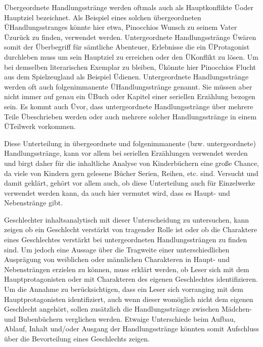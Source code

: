         Übergeordnete Handlungsstränge werden oftmals auch als Hauptkonflikte
        Üoder Hauptziel bezeichnet. Als Beispiel eines solchen übergeordneten
        ÜHandlungsstranges könnte hier etwa, Pinocchios Wunsch zu seinem Vater
        Üzurück zu finden, verwendet werden. Untergeordnete Handlungsstränge
        Üwären somit der Überbegriff für sämtliche Abenteuer, Erlebnisse die ein
        ÜProtagonist durchleben muss um sein Hauptziel zu erreichen oder den
        ÜKonflikt zu lösen. Um bei demselben literarischen Exemplar zu bleiben,
        Ükönnte hier Pinocchios Flucht aus dem Spielzeugland als Beispiel
        Üdienen. Untergeordnete Handlungsstränge werden oft auch folgenimmanente
        ÜHandlungsstränge genannt. Sie müssen aber nicht immer auf genau ein
        ÜBuch oder Kapitel einer seriellen Erzählung bezogen sein. Es kommt auch
        Üvor, dass untergeordnete Handlungsstränge über mehrere Teile
        Übeschrieben werden oder auch mehrere solcher Handlungsstränge in einem
        ÜTeilwerk vorkommen. \parencite[23\psq]{Pick2009}
        
        Diese Unterteilung in übergeordnete und folgenimmanente (bzw.
        untergeordnete) Handlungsstränge, kann vor allem bei seriellen
        Erzählungen verwendet werden und birgt daher für die inhaltliche Analyse
        von Kinderbüchern eine große Chance, da viele von Kindern gern gelesene
        Bücher Serien, Reihen, etc. sind. Versucht und damit geklärt, gehört vor
        allem auch, ob diese Unterteilung auch für Einzelwerke verwendet werden
        kann, da auch hier vermutet wird, dass es Haupt- und Nebenstränge gibt.
        
        Geschlechter inhaltsanalytisch mit dieser Unterscheidung zu untersuchen,
        kann zeigen ob ein Geschlecht verstärkt von tragender Rolle ist oder ob
        die Charaktere eines Geschlechtes verstärkt bei untergeordneten
        Handlungssträngen zu finden sind. Um jedoch eine Aussage über die
        Tragweite einer unterschiedlichen Ausprägung von weiblichen oder
        männlichen Charakteren in Haupt- und Nebensträngen erzielen zu können,
        muss erklärt werden, ob Leser sich mit dem Hauptprotagonisten oder mit
        Charakteren des eigenen Geschlechtes identifizieren. Um die Annahme zu
        berücksichtigen, dass ein Leser sich vorranging mit dem
        Hauptprotagonisten identifiziert, auch wenn dieser womöglich nicht dem
        eigenen Geschlecht angehört, sollen zusätzlich die Handlungsstränge
        zwischen Mädchen- und Bubenbüchern verglichen werden. Etwaige
        Unterschiede beim Aufbau, Ablauf, Inhalt und/oder Ausgang der
        Handlungsstränge könnten somit Aufschluss über die Bevorteilung eines
        Geschlechts zeigen.

